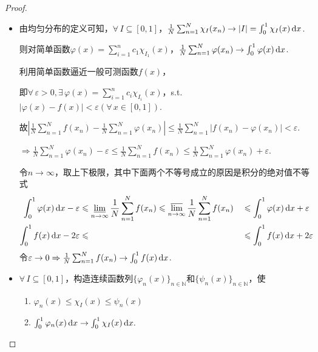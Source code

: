 \begin{proof}
    \begin{itemize}
        \item[“$\Rightarrow$”] 由均匀分布的定义可知，$\forall\, I \subseteq [0,1]$，$\frac{1}{N}\sum_{n=1}^N{\chi_{I}(x_n)} \to |I| = \int_0^1{\chi_{I}(x)}\mathop{}\!\mathrm{d} x$.\par
        则对简单函数$\varphi(x)=\sum_{i=1}^n{c_1\chi_{I_1}(x)}$，$\frac{1}{N}\sum_{n=1}^N{\varphi(x_n)}\to \int_{0}^{1}{\varphi(x)}\mathop{}\!\mathrm{d} x$.\par
        利用简单函数逼近一般可测函数$f(x)$， \par
        即$\forall\, \varepsilon>0,\exists\, \varphi(x)=\sum_{i=1}^n{c_i\chi_{I_i}(x)}$，s.t. $|\varphi(x)-f(x)| < \varepsilon(\forall\, x\in [0,1])$.\par
        故$\left\lvert \frac{1}{N}\sum_{n=1}^N{f(x_n)} - \frac{1}{N}\sum_{n=1}^N{\varphi(x_n)} \right\rvert \leqslant \frac{1}{N}\sum_{n=1}^N{\left\lvert f(x_n)-\varphi(x_n) \right\rvert} < \varepsilon$.\par
        $\Rightarrow \frac{1}{N}\sum_{n=1}^N{\varphi(x_n)} - \varepsilon \leq \frac{1}{N}\sum_{n=1}^N{f(x_n)} \leq \frac{1}{N}\sum_{n=1}^N{\varphi(x_n)} + \varepsilon$.\par
        令$n\to\infty$，取上下极限，其中下面两个不等号成立的原因是积分的绝对值不等式
        \begin{alignat*}{2}
            \int_0^1{\varphi(x)}\mathop{}\!\mathrm{d} x - \varepsilon &\leqslant \varliminf_{n\to\infty}{\frac{1}{N}\sum_{n=1}^N{f(x_n)}} \leqslant \varlimsup_{n\to\infty}{\frac{1}{N}\sum_{n=1}^N{f(x_n)}} &&\leqslant \int_0^1{\varphi(x)}\mathop{}\!\mathrm{d} x + \varepsilon  \\
            \int_0^1{f(x)}\mathop{}\!\mathrm{d} x - 2\varepsilon &\leqslant &&\leqslant \int_0^1{f(x)}\mathop{}\!\mathrm{d} x + 2\varepsilon
        \end{alignat*}
        令$\varepsilon\to 0 \Rightarrow \frac{1}{N}\sum_{n=1}^N{f(x_n)}\to \int_{0}^{1}{f(x)}\mathop{}\!\mathrm{d} x$.\par
    \end{itemize}
    \begin{minipage}[t]{0.77\textwidth}
    \begin{itemize}
        \item[“$\Leftarrow$"] $\forall\, I \subseteq [0,1]$，构造连续函数列$\{\varphi_n(x)\}_{n\in\mathbb{N}}$和$\{\psi_n(x)\}_{n\in\mathbb{N}}$，使
        \begin{enumerate}[(1)]
            \item $\varphi_n(x) \leq \chi_{I}(x) \leq \psi_n(x)$
            \item $\int_0^1{\varphi_n(x)}\mathop{}\!\mathrm{d} x \to \int_0^1{\chi_{I}(x)}\mathop{}\!\mathrm{d} x.$\par

\end{enumerate}
\end{itemize}
\end{minipage}
\end{proof}
